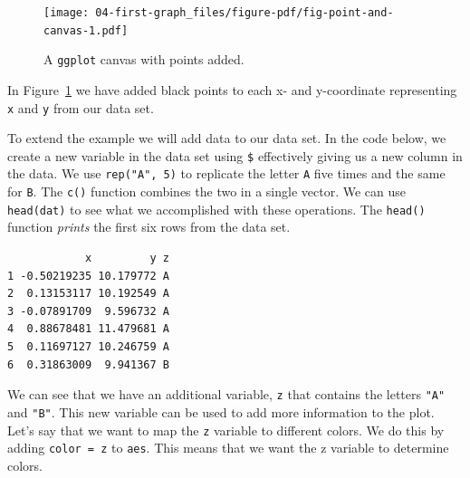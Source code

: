 \documentclass[
  11pt,
  letterpaper,
]{scrbook}
\newenvironment{Shaded}{\begin{snugshade}}{\end{snugshade}}
\newcommand{\DecValTok}[1]{\textcolor[rgb]{0.68,0.00,0.00}{#1}}
\newcommand{\FunctionTok}[1]{\textcolor[rgb]{0.28,0.35,0.67}{#1}}
\newcommand{\NormalTok}[1]{\textcolor[rgb]{0.00,0.23,0.31}{#1}}
\newcommand{\OtherTok}[1]{\textcolor[rgb]{0.00,0.23,0.31}{#1}}
\newcommand{\SpecialCharTok}[1]{\textcolor[rgb]{0.37,0.37,0.37}{#1}}
\newcommand{\StringTok}[1]{\textcolor[rgb]{0.13,0.47,0.30}{#1}}
\begin{document}
\begin{figure}[H]

{\centering \texttt{[image: 04-first-graph\_files/figure-pdf/fig-point-and-canvas-1.pdf]}

}

\caption{\label{fig-point-and-canvas}A \texttt{ggplot} canvas with
points added.}

\end{figure}

In Figure~\ref{fig-point-and-canvas} we have added black points to each
x- and y-coordinate representing \texttt{x} and \texttt{y} from our data
set.

To extend the example we will add data to our data set. In the code
below, we create a new variable in the data set using \texttt{\$}
effectively giving us a new column in the data. We use
\texttt{rep("A",\ 5)} to replicate the letter \texttt{A} five times and
the same for \texttt{B}. The \texttt{c()} function combines the two in a
single vector. We can use \texttt{head(dat)} to see what we accomplished
with these operations. The \texttt{head()} function \emph{prints} the
first six rows from the data set.

\begin{Shaded}
\end{Shaded}

\begin{verbatim}
            x         y z
1 -0.50219235 10.179772 A
2  0.13153117 10.192549 A
3 -0.07891709  9.596732 A
4  0.88678481 11.479681 A
5  0.11697127 10.246759 A
6  0.31863009  9.941367 B
\end{verbatim}

We can see that we have an additional variable, \texttt{z} that contains
the letters \texttt{"A"} and \texttt{"B"}. This new variable can be used
to add more information to the plot. Let's say that we want to map the
\texttt{z} variable to different colors. We do this by adding
\texttt{color\ =\ z} to \texttt{aes}. This means that we want the z
variable to determine colors.
\end{document}
